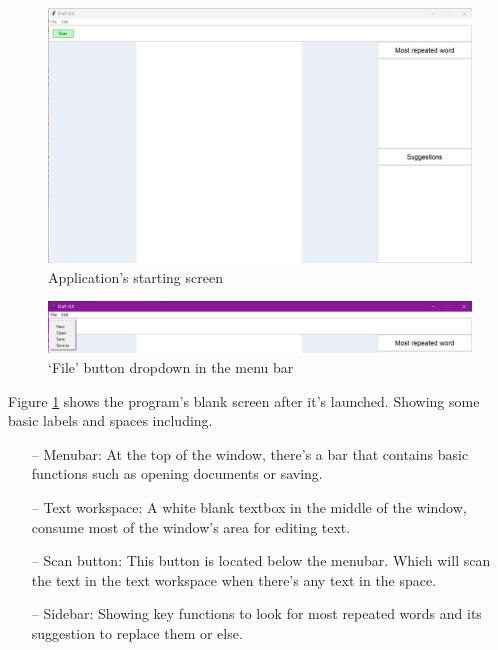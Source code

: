 \documentclass[12pt,oneside,openright,a4paper]{cpe-english-project}
\begin{document}
\begin{figure}[!h]\centering
\includegraphics[width=15cm]{./img/chp4/init.png}
\caption{Application’s starting screen}\label{fig:ui1}
\end{figure}
\begin{figure}[!h]\centering
\includegraphics[width=15cm]{./img/chp4/menubar.png}
\caption{‘File’ button dropdown in the menu bar}\label{fig:ui2}
\end{figure}

Figure \ref{fig:ui1} shows the program's blank screen after it’s launched. Showing some basic labels and spaces including.
\begin{itemize}
\item[--] Menubar: At the top of the window, there’s a bar that contains basic functions such as opening documents or saving.
\item[--] Text workspace: A white blank textbox in the middle of the window, consume most of the window’s area for editing text.
\item[--] Scan button: This button is located below the menubar. Which will scan the text in the text workspace when there’s any text in the space.
\item[--] Sidebar: Showing key functions to look for most repeated words and its suggestion to replace them or else.
\end{itemize}
\end{document}
